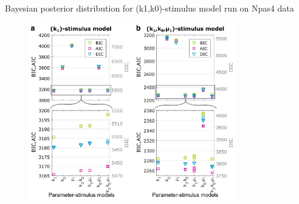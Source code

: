 \documentclass[aspectratio=1610]{beamer}					%
\begin{document}
\begin{frame}{Bayesian posterior distribution for (k1,k0)-stimulus model run on Npas4 data}

\begin{figure}
\includegraphics[width=9cm]{figure-5.png}
\end{figure}

\end{frame}
\end{document}

